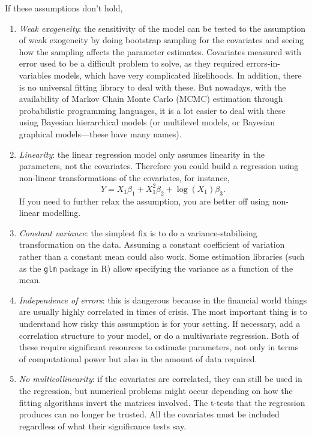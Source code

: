 \documentclass{article}
\theoremstyle{definition}
\begin{document}
  If these assumptions don't hold, 
  \begin{enumerate}
    \item \textit{Weak exogeneity}: the sensitivity of the model can be tested to the assumption of weak exogeneity by doing bootstrap sampling for the covariates and seeing how the sampling affects the parameter estimates.
    Covariates measured with error used to be a difficult problem to solve, as they required errors-in-variables models, which have very complicated likelihoods. In addition, there is no universal fitting library to deal with these. But nowadays, with the availability of Markov Chain Monte Carlo (MCMC) estimation through probabilistic programming languages, it is a lot easier to deal with these using Bayesian hierarchical models (or multilevel models, or Bayesian graphical models---these have many names).
    \item \textit{Linearity}: the linear regression model only assumes linearity in the parameters, not the covariates. Therefore you could build a regression using non-linear transformations of the covariates, for instance,
    \[
      Y = X_1 \beta_1 +
          X_1^2 \beta_2 +
          \log(X_1) \beta_3
      \text{.}
    \]
    If you need to further relax the assumption, you are better off using non-linear modelling. 
    \item \textit{Constant variance}: the simplest fix is to do a variance-stabilising transformation on the data. Assuming a constant coefficient of variation rather than a constant mean could also work. Some estimation libraries (such as the \verb+glm+ package in R) allow specifying the variance as a function of the mean.
    \item \textit{Independence of errors}: this is dangerous because in the financial world things are usually highly correlated in times of crisis. The most important thing is to understand how risky this assumption is for your setting. If necessary, add a correlation structure to your model, or do  a multivariate regression. Both of these require significant resources to estimate parameters, not only in terms of computational power but also in the amount of data required.
    \item \textit{No multicollinearity}:  
    if the covariates are correlated, they can still be used in the regression, but numerical problems might occur depending on how the fitting algorithms invert the matrices involved.
    The t-tests that the regression produces can no longer be trusted. All the covariates must be included regardless of what their significance tests say.

\end{enumerate}
\end{document}
